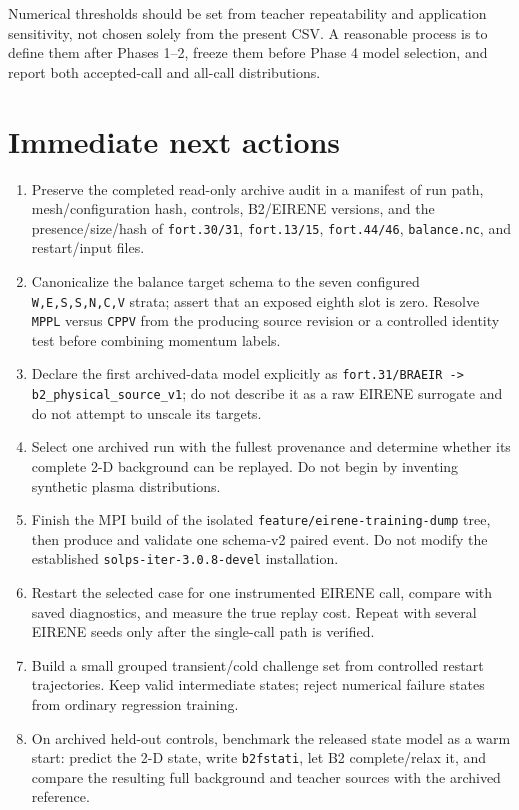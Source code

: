 \documentclass[11pt]{article}
\begin{document}
Numerical thresholds should be set from teacher repeatability and application sensitivity, not chosen solely from the present CSV. A reasonable process is to define them after Phases 1--2, freeze them before Phase 4 model selection, and report both accepted-call and all-call distributions.

\section{Immediate next actions}

\begin{enumerate}
\item Preserve the completed read-only archive audit in a manifest of run path, mesh/configuration hash, controls, B2/EIRENE versions, and the presence/size/hash of \texttt{fort.30/31}, \texttt{fort.13/15}, \texttt{fort.44/46}, \texttt{balance.nc}, and restart/input files.
\item Canonicalize the balance target schema to the seven configured \texttt{W,E,S,S,N,C,V} strata; assert that an exposed eighth slot is zero. Resolve \texttt{MPPL} versus \texttt{CPPV} from the producing source revision or a controlled identity test before combining momentum labels.
\item Declare the first archived-data model explicitly as \texttt{fort.31/BRAEIR -> b2\_physical\_source\_v1}; do not describe it as a raw EIRENE surrogate and do not attempt to unscale its targets.
\item Select one archived run with the fullest provenance and determine whether its complete 2-D background can be replayed. Do not begin by inventing synthetic plasma distributions.
\item Finish the MPI build of the isolated \texttt{feature/eirene-training-dump} tree, then produce and validate one schema-v2 paired event. Do not modify the established \texttt{solps-iter-3.0.8-devel} installation.
\item Restart the selected case for one instrumented EIRENE call, compare with saved diagnostics, and measure the true replay cost. Repeat with several EIRENE seeds only after the single-call path is verified.
\item Build a small grouped transient/cold challenge set from controlled restart trajectories. Keep valid intermediate states; reject numerical failure states from ordinary regression training.
\item On archived held-out controls, benchmark the released state model as a warm start: predict the 2-D state, write \texttt{b2fstati}, let B2 complete/relax it, and compare the resulting full background and teacher sources with the archived reference.

\end{enumerate}
\end{document}
